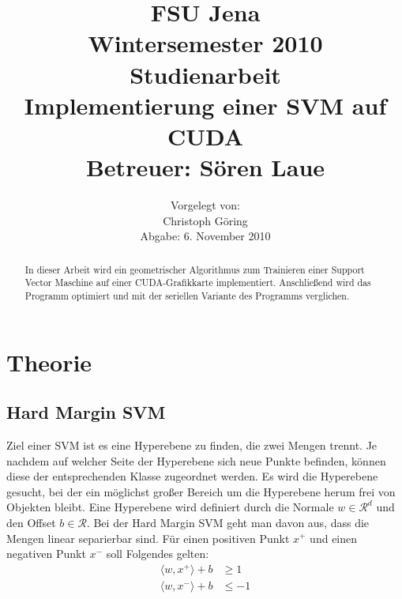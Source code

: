 \documentclass[ngerman]{scrartcl}
\title{%
\large FSU Jena\\
Wintersemester 2010\\
Studienarbeit \\[10mm]
{\LARGE Implementierung einer SVM auf CUDA}\\[10mm]
Betreuer: Sören Laue}
\author{%
Vorgelegt von:\\[10mm]
Christoph Göring\\
Abgabe: 6. November 2010\\
}
\date{}
\begin{document}

\maketitle
\begin{abstract}
In dieser Arbeit wird ein geometrischer Algorithmus zum Trainieren einer Support Vector Maschine auf einer CUDA-Grafikkarte implementiert. 
Anschließend wird das Programm optimiert und mit der seriellen Variante des Programms verglichen.
\end{abstract}

\clearpage
\tableofcontents
\clearpage
\listoftables
\clearpage


\section{Theorie}
\subsection{Hard Margin SVM}
Ziel einer SVM ist es eine Hyperebene zu finden, die zwei Mengen trennt.
Je nachdem auf welcher Seite der Hyperebene sich neue Punkte befinden, können diese der entsprechenden Klasse zugeordnet werden.
Es wird die Hyperebene gesucht, bei der ein möglichst großer Bereich um die Hyperebene herum frei von Objekten bleibt.
Eine Hyperebene wird definiert durch die Normale $w \in \mathcal R^d$ und den Offset $b \in \mathcal R$.
Bei der Hard Margin SVM geht man davon aus, dass die Mengen linear separierbar sind.
Für einen positiven Punkt $x^+$ und einen negativen Punkt $x^-$ soll Folgendes gelten:
\begin{align}
\langle w , x^+ \rangle + b &\ge 1 \\
\langle w , x^- \rangle + b &\le -1 
\end{align}
\end{document}
